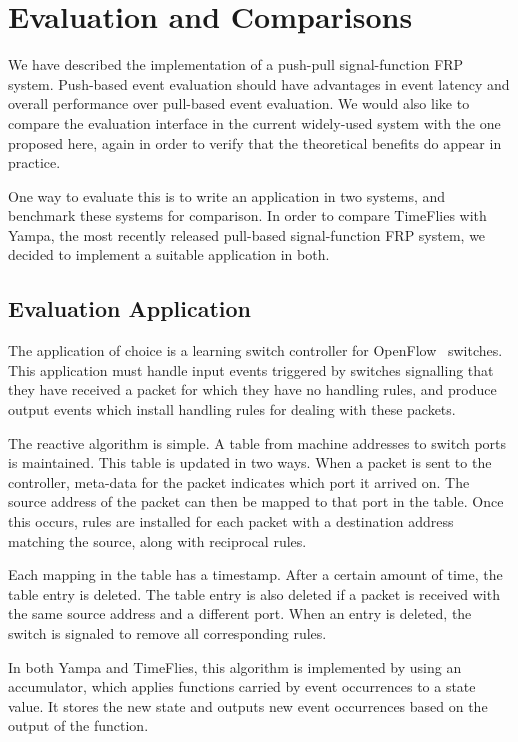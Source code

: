 \chapter{Evaluation and Comparisons}
\label{chapter:Evaluation_and_Comparisons}

We have described the implementation of a push-pull signal-function FRP system.
Push-based event evaluation should have advantages in event latency and overall
performance over pull-based event evaluation. We would also like to compare
the evaluation interface in the current widely-used system with the one proposed
here, again in order to verify that the theoretical benefits do appear in
practice.

One way to evaluate this is to write an application in two systems, and benchmark
these systems for comparison. In order to compare TimeFlies with Yampa, the most
recently released pull-based signal-function FRP system, we decided to implement
a suitable application in both.

\section{Evaluation Application}
\label{section:Evaluation_and_Comparisons-Evaluation_Application}

The application of choice is a learning switch controller for OpenFlow~\cite{OpenflowSpec}
switches. This application must handle input events triggered by switches
signalling that they have received a packet for which they have no handling
rules, and produce output events which install handling rules for dealing with
these packets.

The reactive algorithm is simple. A table from machine addresses to switch ports
is maintained. This table is updated in two ways. When a packet is sent to the
controller, meta-data for the packet indicates which port it arrived on. The
source address of the packet can then be mapped to that port in the table.
Once this occurs, rules are installed for each packet with a destination address
matching the source, along with reciprocal rules.

Each mapping in the table has a timestamp. After a certain amount of time, the
table entry is deleted. The table entry is also deleted if a packet is received
with the same source address and a different port. When an entry is deleted,
the switch is signaled to remove all corresponding rules.

In both Yampa and TimeFlies, this algorithm is implemented by using an accumulator,
which applies functions carried by event occurrences to a state value. It stores
the new state and outputs new event occurrences based on the output of the function.

